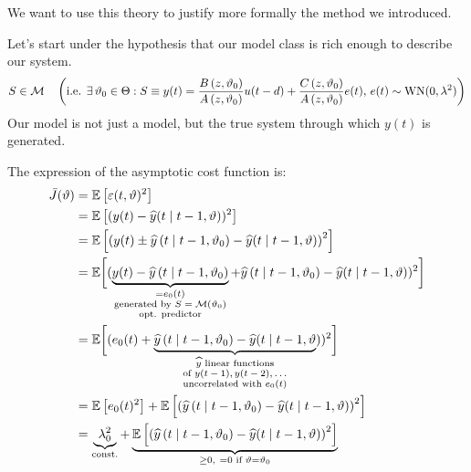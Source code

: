 We want to use this theory to justify more formally the method we introduced.

Let's start under the hypothesis that our model class is rich enough to describe our system.
\begin{equation*}
S\in \mathcal{M} \quad \left(\text{i.e. }\exists\,\vartheta _{0} \in \Theta :S\equiv y(t) =\frac{B\left(z,\vartheta _{0}\right)}{A\left(z,\vartheta _{0}\right)} u(t-d) +\frac{C\left(z,\vartheta _{0}\right)}{A\left(z,\vartheta _{0}\right)} e(t),\, e(t) \sim \operatorname{WN}(0,\lambda ^{2})\right)
\end{equation*}
Our model is not just a model, but the true system through which $ y(t)$ is generated.

The expression of the asymptotic cost function is:
\begin{align*}
	\bar{J}(\vartheta) & =\mathbb{E}\left[ \varepsilon (t,\vartheta)^{2}\right] \\
	& = \mathbb{E}\left[(y(t) -\widehat{y}(t\mid t-1,\vartheta))^{2}\right] \\
	& = \mathbb{E}\left[\left(y(t) \pm \widehat{y}\left(t\mid t-1,\vartheta _{0}\right) -\widehat{y}(t\mid t-1,\vartheta)\right)^{2}\right] \\
	& = \mathbb{E}\bigg[(\underbrace{
			y(t) -\widehat{y}\left(t\mid t-1,\vartheta_{0}\right)
		}_{
			\substack{=e_{0}(t) \\ \text{generated by $S=\mathcal{M}(\vartheta_{0})$} \\ \text{opt. predictor}}
		}
		+ \widehat{y}\left(t\mid t-1,\vartheta _{0}\right) -\widehat{y}(t\mid t-1,\vartheta))^{2}\bigg] \\
	& = \mathbb{E}\bigg[(e_{0}(t) + \underbrace{
			\widehat{y}\left(t\mid t-1,\vartheta _{0}\right) -\widehat{y}(t\mid t-1,\vartheta
		}_{
			\substack{\text{$\widehat{y}$ linear functions} \\ \text{of $y(t-1),y(t-2),\ldots$} \\ \text{uncorrelated with $e_{0}(t)$}}
		}
		))^{2}\bigg] \\
	& = \mathbb{E}\left[ e_{0}(t)^{2}\right] +\mathbb{E}\left[\left(\widehat{y}\left(t\mid t-1,\vartheta _{0}\right) -\widehat{y}(t\mid t-1,\vartheta)\right)^{2}\right] \\
	& = \underbrace{\lambda _{0}^{2}}_{\text{const.}} +\underbrace{\mathbb{E}\left[\left(\widehat{y}\left(t\mid t-1,\vartheta _{0}\right) -\widehat{y}(t\mid t-1,\vartheta)\right)^{2}\right]}_{\geq 0,\ =0\text{ if } \vartheta =\vartheta _{0}}
\end{align*}

